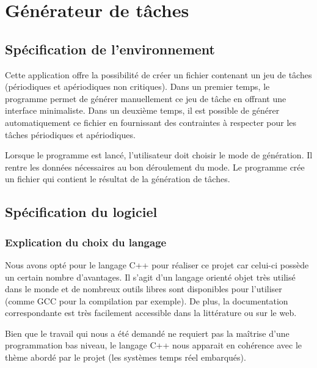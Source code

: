

\chapter{Générateur de tâches}
	\label{chap:1}
	
	\section{Spécification de l’environnement}
	
	Cette application offre la possibilité de créer un fichier contenant un jeu de tâches (périodiques et apériodiques non critiques).
	Dans un premier temps, le programme permet de générer manuellement ce jeu de tâche en offrant une interface minimaliste.
	Dans un deuxième temps, il est possible de générer automatiquement ce fichier en fournissant des contraintes à respecter pour les tâches périodiques et apériodiques.
	
	
	Lorsque le programme est lancé, l’utilisateur doit choisir le mode de génération. Il rentre les données nécessaires au bon déroulement du mode. Le programme crée un fichier qui contient le résultat de la génération de tâches.


	\section{Spécification du logiciel}

		\subsection{Explication du choix du langage}
	
			\label{sec:langage}
			Nous avons opté pour le langage C++ pour réaliser ce projet car celui-ci possède un certain nombre d'avantages. Il s'agit d'un langage orienté objet très utilisé dans le monde et de nombreux outils libres sont disponibles pour l'utiliser (comme GCC pour la compilation par exemple). De plus, la documentation correspondante est très facilement accessible dans la littérature ou sur le web.
		
			Bien que le travail qui nous a été demandé ne requiert pas la maîtrise d'une programmation bas niveau, le langage C++ nous apparait en cohérence avec le thème abordé par le projet (les systèmes temps réel embarqués).

